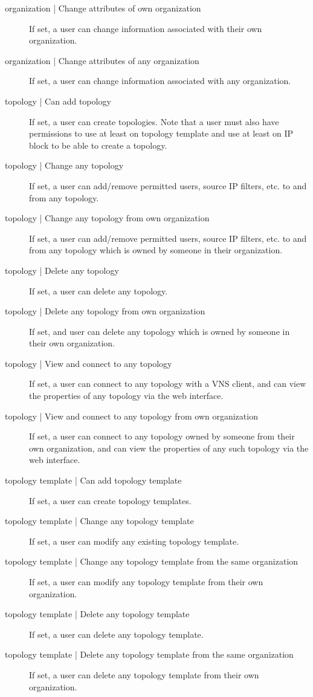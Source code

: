 \documentclass[a4paper,12pt]{report}
\begin{document}
\begin{description}
\item[organization | Change attributes of own organization]  If set, a user can change information associated with their own organization.
\item[organization | Change attributes of any organization]  If set, a user can change information associated with any organization.
\item[topology | Can add topology]  If set, a user can create topologies.  Note that a user must also have permissions to use at least on topology template and use at least on IP block to be able to create a topology.
\item[topology | Change any topology]  If set, a user can add/remove permitted users, source IP filters, etc. to and from any topology.
\item[topology | Change any topology from own organization]  If set, a user can add/remove permitted users, source IP filters, etc. to and from any topology which is owned by someone in their organization.
\item[topology | Delete any topology]  If set, a user can delete any topology.
\item[topology | Delete any topology from own organization]  If set, and user can delete any topology which is owned by someone in their own organization.
\item[topology | View and connect to any topology]  If set, a user can connect to any topology with a VNS client, and can view the properties of any topology via the web interface.
\item[topology | View and connect to any topology from own organization]  If set, a user can connect to any topology owned by someone from their own organization, and can view the properties of any such topology via the web interface.
\item[topology template | Can add topology template]  If set, a user can create topology templates.
\item[topology template | Change any topology template]  If set, a user can modify any existing topology template.
\item[topology template | Change any topology template from the same organization]  If set, a user can modify any topology template from their own organization.
\item[topology template | Delete any topology template]  If set, a user can delete any topology template.
\item[topology template | Delete any topology template from the same organization]  If set, a user can delete any topology template from their own organization.

\end{description}
\end{document}

